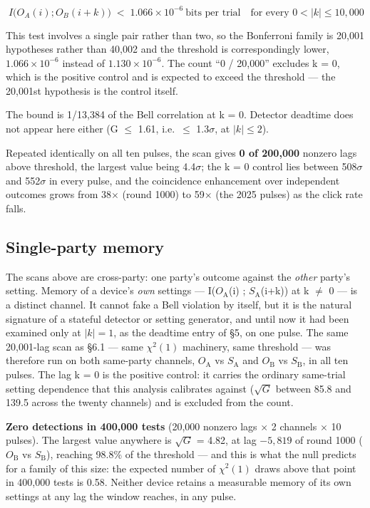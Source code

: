 \documentclass[
  11pt,
]{article}
\begin{document}
\begin{equation}
\boxed{\;I\big(O_A(i) ; O_B(i+k)\big) \;<\; 1.066\times10^{-6}\ \text{bits per trial}\quad\text{for every } 0 < |k| \le 10{,}000\;}
\label{eq:bound2}
\end{equation}

This test involves a single pair rather than two, so the Bonferroni
family is 20,001 hypotheses rather than 40,002 and the threshold is
correspondingly lower, \(1.066 \times 10^{-6}\) instead of
\(1.130 \times 10^{-6}\). The count ``0 / 20,000'' excludes k = 0, which
is the positive control and is expected to exceed the threshold --- the
20,001st hypothesis is the control itself.

The bound is 1/13,384 of the Bell correlation at k = 0. Detector
deadtime does not appear here either (G \(\le\) 1.61, i.e.~\(\le\)
1.3\(\sigma\), at \(|k| \le 2\)).

Repeated identically on all ten pulses, the scan gives \textbf{0 of
200,000} nonzero lags above threshold, the largest value being
4.4\(\sigma\); the k = 0 control lies between 508\(\sigma\) and
552\(\sigma\) in every pulse, and the coincidence enhancement over
independent outcomes grows from 38\(\times\) (round 1000) to
59\(\times\) (the 2025 pulses) as the click rate falls.

\subsection{Single-party memory}

The scans above are cross-party: one party's outcome against the
\emph{other} party's setting. Memory of a device's \emph{own} settings
--- I(\(O_{\mathrm{A}}\)(i) ; \(S_{\mathrm{A}}\)(i+k)) at k \(\ne\) 0
--- is a distinct channel. It cannot fake a Bell violation by itself,
but it is the natural signature of a stateful detector or setting
generator, and until now it had been examined only at \(|k| = 1\), as
the deadtime entry of \S5, on one pulse. The same 20,001-lag scan as
\S6.1 --- same \(\chi^2(1)\) machinery, same threshold --- was therefore
run on both same-party channels, \(O_{\mathrm{A}}\) vs
\(S_{\mathrm{A}}\) and \(O_{\mathrm{B}}\) vs \(S_{\mathrm{B}}\), in all
ten pulses. The lag k = 0 is the positive control: it carries the
ordinary same-trial setting dependence that this analysis calibrates
against (\(\sqrt{G}\) between 85.8 and 139.5 across the twenty channels)
and is excluded from the count.

\textbf{Zero detections in 400,000 tests} (20,000 nonzero lags
\(\times\) 2 channels \(\times\) 10 pulses). The largest value anywhere
is \(\sqrt{G}\) = 4.82, at lag \(-5,819\) of round 1000
(\(O_{\mathrm{B}}\) vs \(S_{\mathrm{B}}\)), reaching 98.8\% of the
threshold --- and this is what the null predicts for a family of this
size: the expected number of \(\chi^2(1)\) draws above that point in
400,000 tests is 0.58. Neither device retains a measurable memory of its
own settings at any lag the window reaches, in any pulse.
\end{document}
